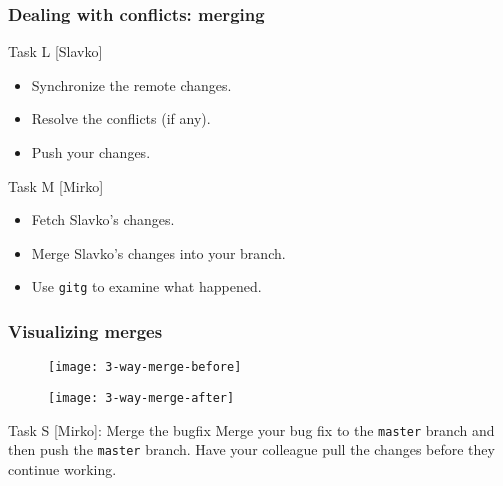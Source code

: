 
\begin{frame}[fragile]
	\frametitle{Dealing with conflicts: merging}

	
	\begin{block}{Task L [Slavko]}
	\begin{itemize}
	\item Synchronize the remote changes.
	\item Resolve the conflicts (if any).
	\item Push your changes.
	\end{itemize}
	\end{block}
	
	\begin{block}{Task M [Mirko]}
	\begin{itemize}

	\item Fetch Slavko's changes.
	\item Merge Slavko's changes into your branch.
	\item Use \texttt{gitg} to examine what happened.

	\end{itemize}
	\end{block}
	

\end{frame}


\begin{frame}[fragile]

\frametitle{Visualizing merges}

\begin{multicols}{2}
	\begin{figure}
		\texttt{[image: 3-way-merge-before]}
	\end{figure}
	\begin{figure}
		\texttt{[image: 3-way-merge-after]}
	\end{figure}
\end{multicols}

	\begin{block}{Task S [Mirko]: Merge the bugfix}
	Merge your bug fix to the \texttt{master} branch and then push the \texttt{master} branch. Have your colleague pull the changes before they continue working.
	\end{block}
\end{frame}

